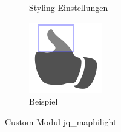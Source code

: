 \begin{figure}[H]
\begin{subfigure}[b]{0.4\textwidth}
		\caption[]{Styling Einstellungen}
		\label{fig:config_maphilight_style}
	\end{subfigure}
	\begin{subfigure}[b]{0.2\textwidth}
		\centering
		\includegraphics[width=0.95\linewidth]{images/example_maphighlight}
		\caption[]{Beispiel}
		\label{fig:example_maphilight}
	\end{subfigure}
	\caption{Custom Modul jq\_maphilight}
	\label{fig:config_maphilight}
\end{figure}

